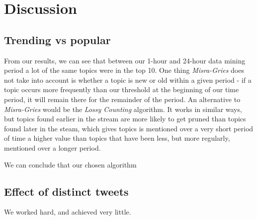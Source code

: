 \section{Discussion}\label{conclusions}

\subsection{Trending vs popular}\label{trending-discussion}

From our results, we can see that between our 1-hour and 24-hour data mining period a lot of the same topics were in the top 10. One thing \textit{Misra-Gries} does not take into account is whether a topic is new or old within a given period - if a topic occurs more frequently than our threshold at the beginning of our time period, it will remain there for the remainder of the period. An alternative to \textit{Misra-Gries} would be the \textit{Lossy Counting} algorithm. It works in similar ways, but topics found earlier in the stream are more likely to get pruned than topics found later in the steam, which gives topics is mentioned over a very short period of time a higher value than topics that have been less, but more regularly, mentioned over a longer period.

We can conclude that our chosen algorithm 

\subsection{Effect of distinct tweets}\label{trending-distinct}

We worked hard, and achieved very little.